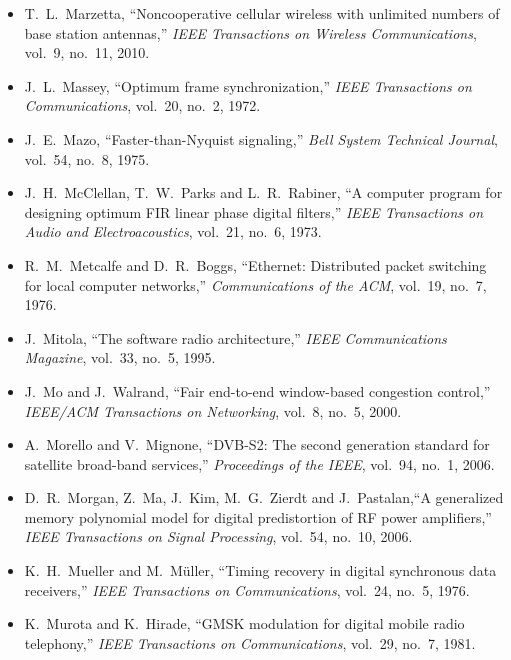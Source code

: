 \begin{itemize}[leftmargin=1.5em,itemindent=-1.5em,itemsep=1.5pt plus 1pt,parsep=0pt,topsep=4pt,label={}]
\item T.~L.~Marzetta, ``Noncooperative cellular wireless with unlimited numbers of base station antennas,'' \emph{IEEE Transactions on Wireless Communications}, vol.~9, no.~11, 2010.
\item J.~L.~Massey, ``Optimum frame synchronization,'' \emph{IEEE Transactions on Communications}, vol.~20, no.~2, 1972.
\item J.~E.~Mazo, ``Faster-than-Nyquist signaling,'' \emph{Bell System Technical Journal}, vol.~54, no.~8, 1975.
\item J.~H.~McClellan, T.~W.~Parks and L.~R.~Rabiner, ``A computer program for designing optimum FIR linear phase digital filters,'' \emph{IEEE Transactions on Audio and Electroacoustics}, vol.~21, no.~6, 1973.
\item R.~M.~Metcalfe and D.~R.~Boggs, ``Ethernet: Distributed packet switching for local computer networks,'' \emph{Communications of the ACM}, vol.~19, no.~7, 1976.
\item J.~Mitola, ``The software radio architecture,'' \emph{IEEE Communications Magazine}, vol.~33, no.~5, 1995.
\item J.~Mo and J.~Walrand, ``Fair end-to-end window-based congestion control,'' \emph{IEEE/ACM Transactions on Networking}, vol.~8, no.~5, 2000.
\item A.~Morello and V.~Mignone, ``DVB-S2: The second generation standard for satellite broad-band services,'' \emph{Proceedings of the IEEE}, vol.~94, no.~1, 2006.
\item D.~R.~Morgan, Z.~Ma, J.~Kim, M.~G.~Zierdt and J.~Pastalan,``A generalized memory polynomial model for digital predistortion of RF power amplifiers,'' \emph{IEEE Transactions on Signal Processing}, vol.~54, no.~10, 2006.
\item K.~H.~Mueller and M.~M\"uller, ``Timing recovery in digital synchronous data receivers,'' \emph{IEEE Transactions on Communications}, vol.~24, no.~5, 1976.
\item K.~Murota and K.~Hirade, ``GMSK modulation for digital mobile radio telephony,'' \emph{IEEE Transactions on Communications}, vol.~29, no.~7, 1981.

\end{itemize}
